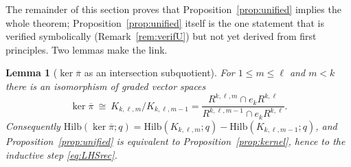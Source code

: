 \documentclass{amsart}
\newtheorem{lemma}{Lemma}
\theoremstyle{definition}
\newcommand{\Hilb}{\mathrm{Hilb}}
\newcommand{\rkl}{R^{k,\ell}}
\newcommand{\Rklm}{R^{k,\ell,m}}
\begin{document}
The remainder of this section proves that Proposition~\ref{prop:unified} implies the
whole theorem; Proposition~\ref{prop:unified} itself is the one statement that is
verified symbolically (Remark~\ref{rem:verifU}) but not yet derived from first
principles. Two lemmas make the link.

\begin{lemma}[$\ker\overline\pi$ as an intersection subquotient]\label{lem:kerinter}
For $1\le m\le\ell$ and $m<k$ there is an isomorphism of graded vector spaces
\begin{equation}\label{eq:kerinter}
\ker\overline\pi\ \cong\ K_{k,\ell,m}\big/ K_{k,\ell,m-1}
=\frac{\Rklm\cap e_k\rkl}{R^{k,\ell,m-1}\cap e_k\rkl}.
\end{equation}
Consequently $\Hilb(\ker\overline\pi;q)=\Hilb(K_{k,\ell,m};q)-\Hilb(K_{k,\ell,m-1};q)$,
and Proposition~\ref{prop:unified} is equivalent to
Proposition~\ref{prop:kernel}, hence to the inductive step \eqref{eq:LHSrec}.
\end{lemma}
\end{document}
